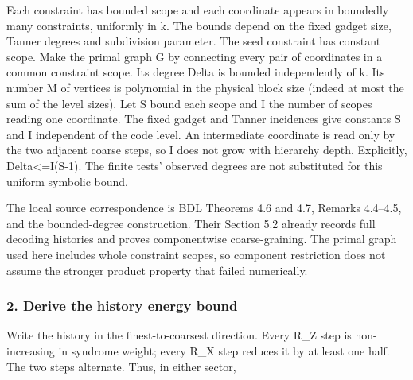 \documentclass[
]{article}
\begin{document}
Each constraint has bounded scope and each coordinate appears in
boundedly many constraints, uniformly in k. The bounds depend on the
fixed gadget size, Tanner degrees and subdivision parameter. The seed
constraint has constant scope. Make the primal graph G by connecting
every pair of coordinates in a common constraint scope. Its degree Delta
is bounded independently of k. Its number M of vertices is polynomial in
the physical block size (indeed at most the sum of the level sizes). Let
S bound each scope and I the number of scopes reading one coordinate.
The fixed gadget and Tanner incidences give constants S and I
independent of the code level. An intermediate coordinate is read only
by the two adjacent coarse steps, so I does not grow with hierarchy
depth. Explicitly, Delta\textless=I(S-1). The finite tests' observed
degrees are not substituted for this uniform symbolic bound.

The local source correspondence is BDL Theorems 4.6 and 4.7, Remarks
4.4--4.5, and the bounded-degree construction. Their Section 5.2 already
records full decoding histories and proves componentwise
coarse-graining. The primal graph used here includes whole constraint
scopes, so component restriction does not assume the stronger product
property that failed numerically.

\subsubsection{2. Derive the history energy
bound}\label{derive-the-history-energy-bound}

Write the history in the finest-to-coarsest direction. Every R\_Z step
is non-increasing in syndrome weight; every R\_X step reduces it by at
least one half. The two steps alternate. Thus, in either sector,
\end{document}
